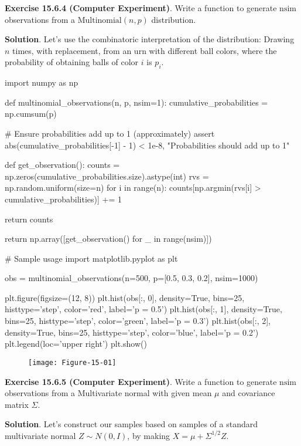 \textbf{Exercise 15.6.4 (Computer Experiment)}. Write a function to
generate \(\text{nsim}\) observations from a
\(\text{Multinomial}(n, p)\) distribution.

\textbf{Solution}. Let's use the combinatoric interpretation of the
distribution: Drawing \(n\) times, with replacement, from an urn with
different ball colors, where the probability of obtaining balls of color
\(i\) is \(p_i\).

\begin{python}
import numpy as np

def multinomial_observations(n, p, nsim=1):
    cumulative_probabilities = np.cumsum(p)
    
    # Ensure probabilities add up to 1 (approximately)
    assert abs(cumulative_probabilities[-1] - 1) < 1e-8, "Probabilities should add up to 1"
    
    def get_observation():
        counts = np.zeros(cumulative_probabilities.size).astype(int)
        rvs = np.random.uniform(size=n)
        for i in range(n):
            counts[np.argmin(rvs[i] > cumulative_probabilities)] += 1

        return counts
    
    return np.array([get_observation() for _ in range(nsim)])
\end{python}

\begin{python}
# Sample usage
import matplotlib.pyplot as plt

obs = multinomial_observations(n=500, p=[0.5, 0.3, 0.2], nsim=1000)

plt.figure(figsize=(12, 8))
plt.hist(obs[:, 0], density=True, bins=25, histtype='step', color='red', label='p = 0.5')
plt.hist(obs[:, 1], density=True, bins=25, histtype='step', color='green', label='p = 0.3')
plt.hist(obs[:, 2], density=True, bins=25, histtype='step', color='blue', label='p = 0.2')
plt.legend(loc='upper right')
plt.show()
\end{python}


\begin{figure}[H]
\texttt{[image: Figure-15-01]}
\end{figure}

\textbf{Exercise 15.6.5 (Computer Experiment)}. Write a function to
generate \(\text{nsim}\) observations from a Multivariate normal with
given mean \(\mu\) and covariance matrix \(\Sigma\).

\textbf{Solution}. Let's construct our samples based on samples of a
standard multivariate normal \(Z \sim N(0, I)\), by making
\(X = \mu + \Sigma^{1/2} Z\).

